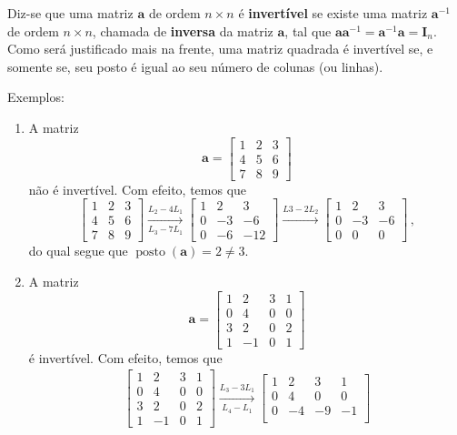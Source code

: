 \documentclass[12pt,a4paper]{report}
\newcommand{\tb}{\textbf}
\newcommand{\mb}{\mathbf}
\DeclareMathOperator{\posto}{posto}
\begin{document}
Diz-se que uma matriz $\mb a$ de ordem $n\times n$ é \tb{invertível} se existe uma matriz $\mb a^{-1}$ de ordem $n\times n$, chamada de \tb{inversa} da matriz $\mb a$, tal que $\mb a\mb a^{-1}=\mb a^{-1}\mb a=\mb I_n$. Como será justificado mais na frente, uma matriz quadrada é invertível se, e somente se, seu posto é igual ao seu número de colunas (ou linhas).

Exemplos:
\begin{enumerate}
  \item A matriz
  $$\mb a=\begin{bmatrix}
    1&2&3\\
    4&5&6\\
    7&8&9
  \end{bmatrix}$$
  não é invertível. Com efeito, temos que
  $$\begin{bmatrix}
    1&2&3\\
    4&5&6\\
    7&8&9
  \end{bmatrix}\xrightarrow[L_3-7L_1]{L_2-4L_1} \begin{bmatrix}
    1&2&3\\
    0&-3&-6\\
    0&-6&-12
  \end{bmatrix}\xrightarrow{L3-2L_2} \begin{bmatrix}
    1&2&3\\
    0&-3&-6\\
    0&0&0
  \end{bmatrix}\,,$$
  do qual segue que $\posto(\mb a)=2\ne 3$.
  \item A matriz
  $$\mb a=\begin{bmatrix}
    1&2&3&1\\
    0&4&0&0\\
    3&2&0&2\\
    1&-1&0&1
  \end{bmatrix}$$
  é invertível. Com efeito, temos que
  \begin{multline*}
    \begin{bmatrix}
      1&2&3&1\\
      0&4&0&0\\
      3&2&0&2\\
      1&-1&0&1
    \end{bmatrix}\xrightarrow[L_4-L_1]{L_3-3L_1} \begin{bmatrix}
      1&2&3&1\\
      0&4&0&0\\
      0&-4&-9&-1\\

\end{bmatrix}
\end{multline*}
\end{enumerate}
\end{document}
